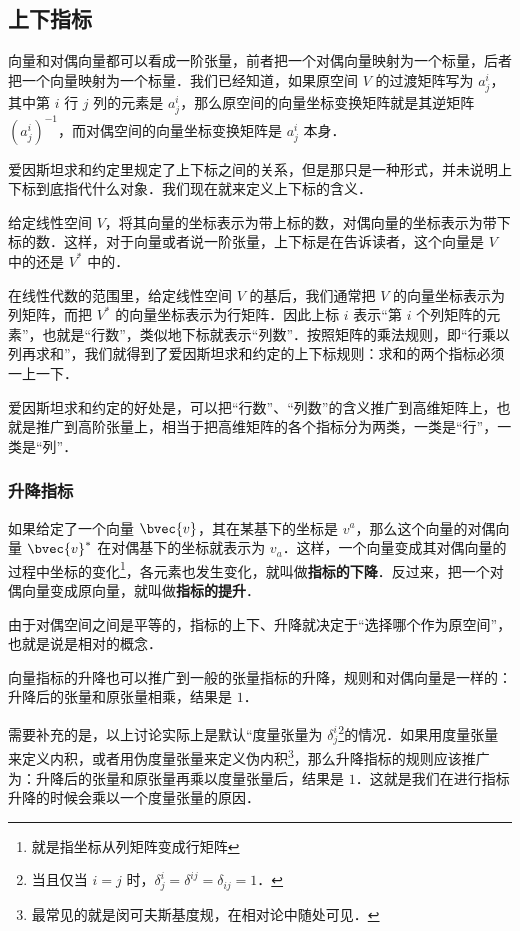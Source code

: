 \subsection{上下指标}

向量和对偶向量都可以看成一阶张量，前者把一个对偶向量映射为一个标量，后者把一个向量映射为一个标量．我们已经知道，如果原空间 $V$ 的过渡矩阵写为 $a^i_j$，其中第 $i$ 行 $j$ 列的元素是 $a^i_j$，那么原空间的向量坐标变换矩阵就是其逆矩阵 $(a^i_j)^{-1}$，而对偶空间的向量坐标变换矩阵是 $a^i_j$ 本身．

爱因斯坦求和约定里规定了上下标之间的关系，但是那只是一种形式，并未说明上下标到底指代什么对象．我们现在就来定义上下标的含义．

\begin{definition}{}
给定线性空间 $V$，将其向量的坐标表示为带上标的数，对偶向量的坐标表示为带下标的数．这样，对于向量或者说一阶张量，上下标是在告诉读者，这个向量是 $V$ 中的还是 $V^*$ 中的．
\end{definition}

在线性代数的范围里，给定线性空间 $V$ 的基后，我们通常把 $V$ 的向量坐标表示为列矩阵，而把 $V^*$ 的向量坐标表示为行矩阵．因此上标 $i$ 表示“第 $i$ 个列矩阵的元素”，也就是“行数”，类似地下标就表示“列数”．按照矩阵的乘法规则，即“行乘以列再求和”，我们就得到了爱因斯坦求和约定的上下标规则：求和的两个指标必须一上一下．

爱因斯坦求和约定的好处是，可以把“行数”、“列数”的含义推广到高维矩阵上，也就是推广到高阶张量上，相当于把高维矩阵的各个指标分为两类，一类是“行”，一类是“列”．

\subsubsection{升降指标}

如果给定了一个向量 $\bvec{v}$，其在某基下的坐标是 $v^a$，那么这个向量的对偶向量 $\bvec{v}^*$ 在对偶基下的坐标就表示为 $v_a$．这样，一个向量变成其对偶向量的过程中坐标的变化\footnote{就是指坐标从列矩阵变成行矩阵}，各元素也发生变化，就叫做\textbf{指标的下降}．反过来，把一个对偶向量变成原向量，就叫做\textbf{指标的提升}．

由于对偶空间之间是平等的，指标的上下、升降就决定于“选择哪个作为原空间”，也就是说是相对的概念．

向量指标的升降也可以推广到一般的张量指标的升降，规则和对偶向量是一样的：升降后的张量和原张量相乘，结果是 $1$．

需要补充的是，以上讨论实际上是默认“度量张量为 $\delta^i_j$\footnote{当且仅当 $i=j$ 时，$\delta^i_j=\delta^{ij}=\delta_{ij}=1$．}的情况．如果用度量张量来定义内积，或者用伪度量张量来定义伪内积\footnote{最常见的就是闵可夫斯基度规，在相对论中随处可见．}，那么升降指标的规则应该推广为：升降后的张量和原张量再乘以度量张量后，结果是 $1$．这就是我们在进行指标升降的时候会乘以一个度量张量的原因．

